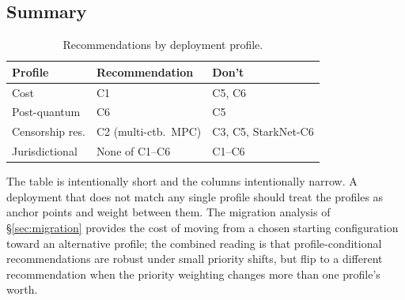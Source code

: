 \subsection{Summary}
\label{sec:rec-summary}

\begin{table}[t]
  \centering
  \caption{Recommendations by deployment profile.}
  \label{tab:recommendations}
  \begin{tabularx}{\columnwidth}{@{}lXl@{}}
    \toprule
    Profile & Recommendation & Don't \\
    \midrule
    Cost              & C1 & C5, C6 \\
    Post-quantum      & C6 & C5 \\
    Censorship res.   & C2 (multi-ctb.\ MPC) & C3, C5, StarkNet-C6 \\
    Jurisdictional    & None of C1--C6 & C1--C6 \\
    \bottomrule
  \end{tabularx}
\end{table}

The table is intentionally short and the columns intentionally narrow.
A deployment that does not match any single profile should treat the
profiles as anchor points and weight between them. The migration
analysis of \S\ref{sec:migration} provides the cost of moving from a
chosen starting configuration toward an alternative profile; the
combined reading is that profile-conditional recommendations are
robust under small priority shifts, but flip to a different
recommendation when the priority weighting changes more than one
profile's worth.

